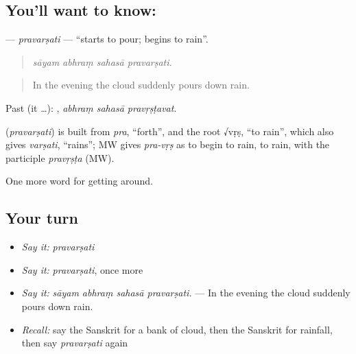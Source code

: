 \subsection*{You'll want to know: }
\textbf{} — \emph{pravarṣati} — \textquotedblleft{}starts to pour; begins to rain\textquotedblright{}.

\begin{quote}
   
\end{quote}

\begin{quote}
\emph{sāyam abhraṃ sahasā pravarṣati.}
\end{quote}

\begin{quote}
In the evening the cloud suddenly pours down rain.
\end{quote}

Past (it …):   , \emph{abhraṃ sahasā pravṛṣṭavat}.

\begin{cousinweb}
\textbf{} (\emph{pravarṣati}) is built from \emph{pra}, \textquotedblleft{}forth\textquotedblright{}, and the root √vṛṣ, \textquotedblleft{}to rain\textquotedblright{}, which also gives \emph{varṣati}, \textquotedblleft{}rains\textquotedblright{}; MW gives \emph{pra-vṛṣ} as to begin to rain, to rain, with the participle \emph{pravṛṣṭa} (MW).
\end{cousinweb}

\begin{grammarlens}[title={What you've built}]
One more word for getting around.
\end{grammarlens}

\subsection*{Your turn}
\begin{itemize}
\raggedright
  \item \emph{Say it:} \emph{pravarṣati}
  \item \emph{Say it:} \emph{pravarṣati}, once more
  \item \emph{Say it:} \emph{sāyam abhraṃ sahasā pravarṣati.} — In the evening the cloud suddenly pours down rain.
  \item \emph{Recall:} say the Sanskrit for a bank of cloud, then the Sanskrit for rainfall, then say \emph{pravarṣati} again
\end{itemize}

